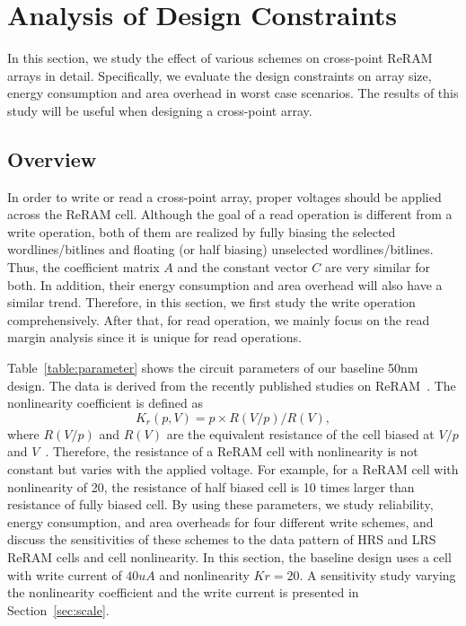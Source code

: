 
\section{Analysis of Design Constraints}\label{sec:w_and_r}

In this section, we study the effect of various schemes on cross-point
ReRAM arrays in detail. Specifically, we evaluate the design constraints
on array size, energy consumption and area overhead in worst case
scenarios. The results of this study will be useful when designing a
cross-point array.

\vspace{-9pt}
\subsection{Overview}
\vspace{-2pt}
In order to write or read a cross-point array, proper voltages should be
applied across the ReRAM cell. Although the goal of a read operation is
different from a write operation, both of them are realized by fully
biasing the selected wordlines/bitlines and floating (or half biasing)
unselected wordlines/bitlines. Thus, the coefficient matrix $A$ and the
constant vector $C$ are very similar for both. In addition, their energy
consumption and area overhead will also have a similar trend. Therefore,
in this section, we first study the write operation comprehensively. After
that, for read operation, we mainly focus on the read margin analysis
since it is unique for read operations.

Table~\ref{table:parameter} shows the circuit parameters of our baseline
50nm design. The data is derived from the recently published studies on
ReRAM~\cite{ReRAM_overview,memristor:Cong,ReRAM_Renesas}. The nonlinearity
coefficient is defined as
\begin{equation}
K_r(p,V) = p \times R(V/p)/R(V),
\end{equation}
where $R(V/p)$ and $R(V)$ are the equivalent resistance of the cell biased
at $V/p$ and $V$~\cite{memristor:Cong}. Therefore, the resistance of a
ReRAM cell with nonlinearity is not constant but varies with the applied
voltage. For example, for a ReRAM cell with nonlinearity of 20, the
resistance of half biased cell is 10 times larger than resistance of fully
biased cell. By using these parameters, we study reliability, energy
consumption, and area overheads for four different write schemes, and
discuss the sensitivities of these schemes to the data pattern of HRS and
LRS ReRAM cells and cell nonlinearity. In this section, the baseline
design uses a cell with write current of $40 uA$ and nonlinearity $Kr=20$.
A sensitivity study varying the nonlinearity coefficient and the write
current is presented in Section~\ref{sec:scale}.

